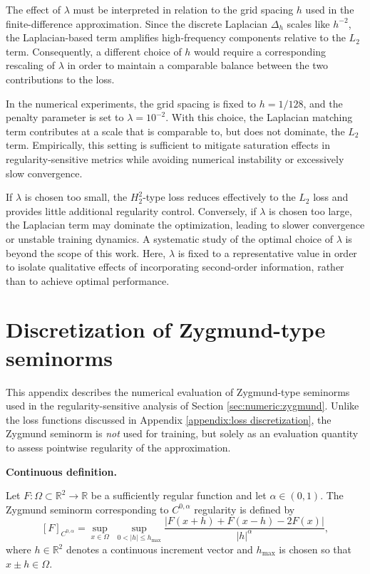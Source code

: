 \documentclass[11pt,reqno]{amsart}
\numberwithin{equation}{section}
\theoremstyle{remark}
\theoremstyle{definition}
\newcommand{\emphTitle}[1]{\medskip\noindent\textbf{#1.}\quad}
\def \L {L_2}
\def \H {H^2_2}
\begin{document}
The effect of $\lambda$ must be interpreted in relation to the grid spacing $h$ used in the finite-difference approximation.
Since the discrete Laplacian $\Delta_h$ scales like $h^{-2}$, the Laplacian-based term amplifies high-frequency components relative to the $\L$ term.
Consequently, a different choice of $h$ would require a corresponding rescaling of $\lambda$ in order to maintain a comparable balance between the two contributions to the loss.

In the numerical experiments, the grid spacing is fixed to $h=1/128$, and the penalty parameter is set to $\lambda=10^{-2}$.
With this choice, the Laplacian matching term contributes at a scale that is comparable to, but does not dominate, the $\L$ term.
Empirically, this setting is sufficient to mitigate saturation effects in regularity-sensitive metrics while avoiding numerical instability or excessively slow convergence.

If $\lambda$ is chosen too small, the $\H$-type loss reduces effectively to the $\L$ loss and provides little additional regularity control.
Conversely, if $\lambda$ is chosen too large, the Laplacian term may dominate the optimization, leading to slower convergence or unstable training dynamics.
A systematic study of the optimal choice of $\lambda$ is beyond the scope of this work.
Here, $\lambda$ is fixed to a representative value in order to isolate qualitative effects of incorporating second-order information, rather than to achieve optimal performance.


\section{Discretization of Zygmund-type seminorms}
\label{appendix:zygmund}

This appendix describes the numerical evaluation of Zygmund-type seminorms used in the regularity-sensitive analysis of Section \ref{sec:numeric:zygmund}. 
Unlike the loss functions discussed in Appendix \ref{appendix:loss discretization}, the Zygmund seminorm is \emph{not} used for training, but solely as an evaluation quantity to assess pointwise regularity of the approximation.

\emphTitle{Continuous definition}

Let $F:\Omega\subset\mathbb{R}^2\to\mathbb{R}$ be a sufficiently regular function and let $\alpha\in(0,1)$.
The Zygmund seminorm corresponding to $C^{0,\alpha}$ regularity is defined by
\[
[F]_{C^{0,\alpha}}
=
\sup_{x\in\Omega}\;
\sup_{0<|h|\le h_{\max}}
\frac{|F(x+h)+F(x-h)-2F(x)|}{|h|^{\alpha}},
\]
where $h\in\mathbb{R}^2$ denotes a continuous increment vector and $h_{\max}$ is chosen so that $x\pm h\in\Omega$.
\end{document}
